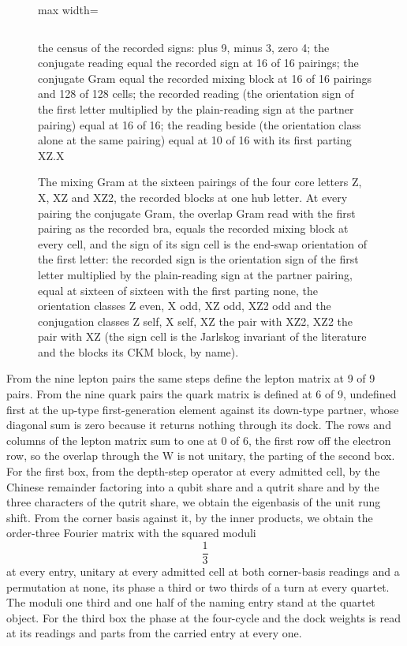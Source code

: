 \begin{chproof}
\begin{figure}[htbp]
{\begin{adjustbox}{max width=\linewidth}
\begin{tabular}{|p{30mm}|p{28mm}|p{28mm}|p{28mm}|p{28mm}|}
\end{tabular}\end{adjustbox}}
\par\smallskip
{\footnotesize the census of the recorded signs: plus 9, minus 3, zero 4; the conjugate reading equal the recorded sign at 16 of 16 pairings; the conjugate Gram equal the recorded mixing block at 16 of 16 pairings and 128 of 128 cells; the recorded reading (the orientation sign of the first letter multiplied by the plain-reading sign at the partner pairing) equal at 16 of 16; the reading beside (the orientation class alone at the same pairing) equal at 10 of 16 with its first parting XZ.X}
\caption{The mixing Gram at the sixteen pairings of the four core letters Z, X, XZ and XZ2, the recorded blocks at one hub letter. At every pairing the conjugate Gram, the overlap Gram read with the first pairing as the recorded bra, equals the recorded mixing block at every cell, and the sign of its sign cell is the end-swap orientation of the first letter: the recorded sign is the orientation sign of the first letter multiplied by the plain-reading sign at the partner pairing, equal at sixteen of sixteen with the first parting none, the orientation classes Z even, X odd, XZ odd, XZ2 odd and the conjugation classes Z self, X self, XZ the pair with XZ2, XZ2 the pair with XZ (the sign cell is the Jarlskog invariant of the literature and the blocks its CKM block, by name).}\label{fig:mixing-gram}
\end{figure}

From the nine lepton pairs the same steps define the lepton matrix at 9 of 9 pairs. From the nine quark pairs the quark matrix is defined at 6 of 9, undefined first at the up-type first-generation element against its down-type partner, whose diagonal sum is zero because it returns nothing through its dock. The rows and columns of the lepton matrix sum to one at 0 of 6, the first row off the electron row, so the overlap through the W is not unitary, the parting of the second box. For the first box, from the depth-step operator at every admitted cell, by the Chinese remainder factoring into a qubit share and a qutrit share and by the three characters of the qutrit share, we obtain the eigenbasis of the unit rung shift. From the corner basis against it, by the inner products, we obtain the order-three Fourier matrix with the squared moduli
\begin{equation}
\frac{1}{3}
\end{equation}
at every entry, unitary at every admitted cell at both corner-basis readings and a permutation at none, its phase a third or two thirds of a turn at every quartet. The moduli one third and one half of the naming entry stand at the quartet object. For the third box the phase at the four-cycle and the dock weights is read at its readings and parts from the carried entry at every one.


\end{chproof}

